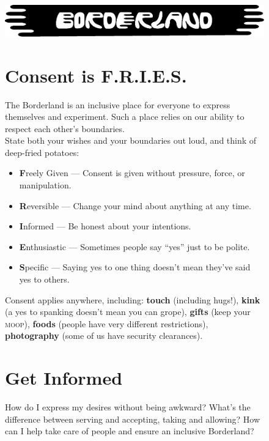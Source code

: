 \documentclass[a4paper,english,12pt]{article}
\begin{document}
\begin{figure}[!b]
  \centering
  \begin{minipage}{.155\textwidth}
    \includegraphics[width=15cm,angle=90,origin=c]{bl-logo-text}
  \end{minipage}
  \begin{minipage}{.835\textwidth}
    \section*{Consent is F.R.I.E.S.}
    \vspace{-3mm}
    The Borderland is an inclusive place for everyone to express themselves and experiment. Such a place relies on our ability to respect each other's boundaries.
    \\[-0.7\baselineskip]

    State both your wishes and your boundaries out loud, and think of deep-fried potatoes:
    \begin{itemize}
    \item \textbf{F}reely Given --- Consent is given without pressure, force, or manipulation.
    \item \textbf{R}eversible --- Change your mind about anything at any time.
    \item \textbf{I}nformed --- Be honest about your intentions.
    \item \textbf{E}nthusiastic --- Sometimes people say ``yes'' just to be polite.
    \item \textbf{S}pecific --- Saying yes to one thing doesn’t mean they've said yes to others.
    \end{itemize}

    \vspace{3mm}
    Consent applies anywhere, including: \textbf{touch} (including hugs!), \textbf{kink} (a yes to spanking doesn't mean you can grope), \textbf{gifts} (keep your \textsc{moop}), \textbf{foods} (people have very different restrictions), \textbf{photography} (some of us have security clearances).
    \vspace{-4mm}
    \section*{Get Informed}
    \vspace{-3mm}
    How do I express my desires without being awkward? What's the difference between serving and accepting, taking and allowing? How can I help take care of people and ensure an inclusive Borderland?


\end{minipage}
\end{figure}
\end{document}
